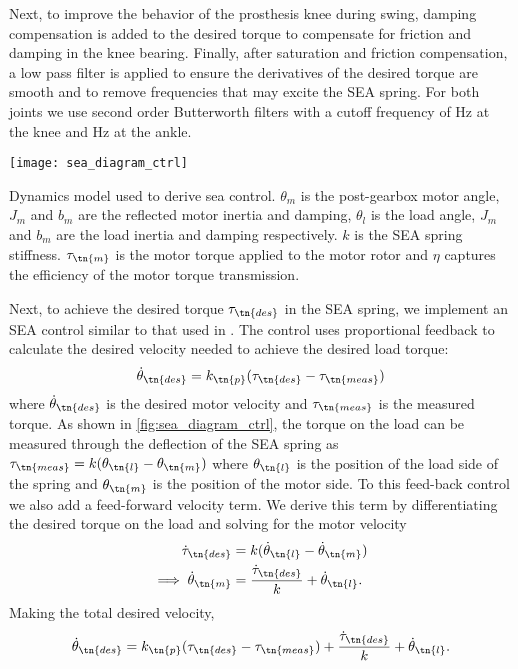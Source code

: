 Next, to improve the behavior of the prosthesis knee during swing, damping
compensation is added to the desired torque to compensate for friction and
damping in the knee bearing. Finally, after saturation and friction
compensation, a low pass filter is applied to ensure the derivatives of the
desired torque are smooth and to remove frequencies that may excite the SEA
spring. For both joints we use second order Butterworth filters with a cutoff
frequency of \unit[25]{Hz} at the knee and \unit[20]{Hz} at the ankle.

\begin{marginfigure}[-0.0in]
    \centering 
    \texttt{[image: sea\_diagram\_ctrl]}
    \caption{Dynamics model used to derive sea control. $\theta_m$ is the
    post-gearbox motor angle, $J_m$ and $b_m$ are the reflected motor inertia
    and damping, $\theta_l$ is the load angle, $J_m$ and $b_m$ are the load
    inertia and damping respectively. $k$ is the SEA spring stiffness.
    $\tau_\tn{m}$ is the motor torque applied to the motor rotor and $\eta$
    captures the efficiency of the motor torque
    transmission.}\label{fig:sea_diagram_ctrl}
\end{marginfigure}
Next, to achieve the desired torque $\tau_\tn{des}$ in the SEA spring, we
implement an SEA control similar to that used in
\citet{schepelmann2012development}. The control uses proportional feedback to
calculate the desired velocity needed to achieve the desired load torque:
\begin{align}
    \dot \theta_\tn{des} = k_\tn{p} (\tau_\tn{des} - \tau_\tn{meas})
\end{align}
where $\dot \theta_\tn{des}$ is the desired motor velocity and $\tau_\tn{meas}$
is the measured torque. As shown in \cref{fig:sea_diagram_ctrl}, the torque on
the load can be measured through the deflection of the SEA spring as
$\tau_\tn{meas} = k (\theta_\tn{l} - \theta_\tn{m})$ where $\theta_\tn{l}$ is
the position of the load side of the spring and $\theta_\tn{m}$ is the position
of the motor side. To this feed-back control we also add a feed-forward velocity
term. We derive this term by differentiating the desired torque on the load and
solving for the motor velocity
\begin{align}
    \dot \tau_\tn{des} &= k (\dot \theta_\tn{l} - \dot \theta_\tn{m}) \\
    \implies \dot \theta_\tn{m} &= \frac{\dot \tau_\tn{des}}{k} 
        + \dot \theta_\tn{l}.\label{eq:motor_vel_from_tau_des}
\end{align}
Making the total desired velocity,
\begin{align}
    \dot \theta_\tn{des} = k_\tn{p} (\tau_\tn{des} - \tau_\tn{meas}) 
        + \frac{\dot \tau_\tn{des}}{k} + \dot \theta_\tn{l}.
\end{align}

